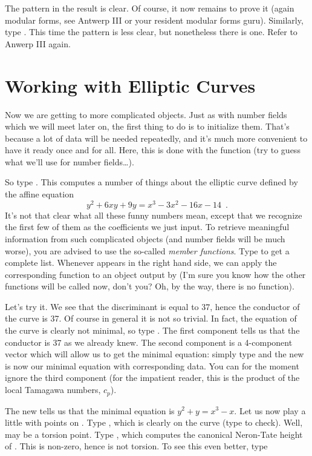 The pattern in the result is clear. Of course, it now remains to prove it
(again modular forms, see Antwerp III or your resident modular forms guru).
Similarly, type . This time the pattern is
less clear, but nonetheless there is one. Refer to Anwerp III again.

\section{Working with Elliptic Curves}

Now we are getting to more complicated objects. Just as with number fields
which we will meet later on, the first thing to do is to initialize them.
That's because a lot of data will be needed repeatedly, and it's much more
convenient to have it ready once and for all. Here, this is done with the
function  (try to guess what we'll use for number fields\dots).

So type . This computes a number of things
about the elliptic curve defined by the affine equation
%
$$ y^2+6xy+9y = x^3-3x^2-16x-14\enspace. $$
%
It's not that clear what all these funny numbers mean, except that we
recognize the first few of them as the coefficients we just input. To
retrieve meaningful information from such complicated objects (and number
fields will be much worse), you are advised to use the so-called {\it member
functions}. Type  to get a complete list. Whenever  appears
in the right hand side, we can apply the corresponding function to an object
output by  (I'm sure you know how the other  functions
will be called now, don't you? Oh, by the way, there is no 
function).

  Let's try it. We see that the discriminant  is equal to 37,
hence the conductor of the curve is 37. Of course in general it is not so
trivial. In fact, the equation of the curve is clearly not minimal, so type
. The first component  tells us that the
conductor is 37 as we already knew. The second component is a 4-component
vector which will allow us to get the minimal equation: simply type
 and the new  is now our minimal
equation with corresponding data. You can for the moment ignore the third
component  (for the impatient reader, this is the product of the
local Tamagawa numbers, $c_p$).

The new  tells us that the minimal equation is $y^2+y = x^3-x$.
Let us now play a little with points on . Type , which is
clearly on the curve (type  to check). Well, 
may be a torsion point. Type , which computes the
canonical Neron-Tate height of . This is non-zero, hence  is
not torsion. To see this even better, type

